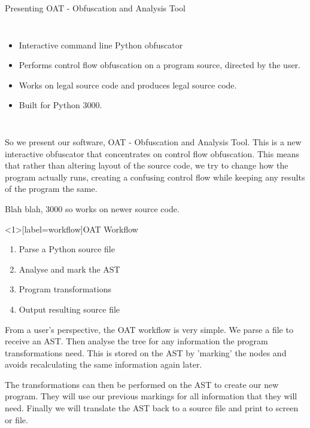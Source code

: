 \begin{frame}{Presenting OAT - Obfuscation and Analysis Tool}
\begin{columns}
\begin{itemize}
\item Interactive command line Python obfuscator
\item Performs control flow obfuscation on a program source, directed by the user.
\item Works on legal source code and produces legal source code.
\item Built for Python 3000.
\end{itemize}
\end{columns}
\end{frame}

So we present our software, OAT - Obfuscation and Analysis Tool. This is a new interactive obfuscator that concentrates on control flow obfuscation.
This means that rather than altering layout of the source code, we try to change how the program actually runs, creating a confusing control flow while
keeping any results of the program the same.

Blah blah, 3000 so works on newer source code.

\begin{frame}<1>[label=workflow]{OAT Workflow}
\begin{enumerate}
\item Parse a Python source file 
\item Analyse and mark the AST 
\item Program transformations
\item Output resulting source file 
\end{enumerate}
\end{frame}

From a user's perspective, the OAT workflow is very simple. We parse a file to receive an AST. Then analyse the tree for any information the program
transformations need. This is stored on the AST by 'marking' the nodes and avoids recalculating the same information again later.

The transformations can then be performed on the AST to create our new program. They will use our previous markings for all information that they will need.
Finally we will translate the AST back to a source file and print to screen or file.

